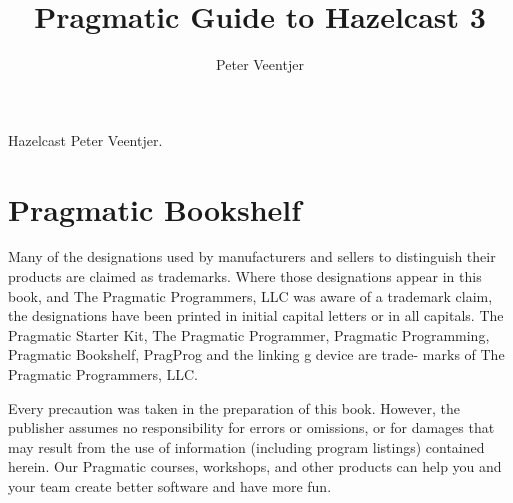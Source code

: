 \documentclass[oneside,20pt]{book}
\begin{document}
\setlength{\parindent}{0in}

\setcounter{tocdepth}{1}


\pagestyle{empty}
\title{\textbf{Pragmatic Guide to Hazelcast 3}}
\author{Peter Veentjer}

\maketitle


\thispagestyle{empty}
Hazelcast
Peter Veentjer.
\newpage


\pagestyle{fancy}
\fancyhf{}
\lhead[]{\thepage}
\rhead[\thepage]{}

\fontsize{12pt}{18pt}
\selectfont




\chapter*{Pragmatic Bookshelf}
Many of the designations used by manufacturers and sellers to distinguish their products are claimed as trademarks. 
Where those designations appear in this book, and The Pragmatic Programmers, LLC was aware of a trademark claim, the 
designations have been printed in initial capital letters or in all capitals. The Pragmatic Starter Kit, The Pragmatic 
Programmer, Pragmatic Programming, Pragmatic Bookshelf, PragProg and the linking g device are trade- marks of The 
Pragmatic Programmers, LLC.

Every precaution was taken in the preparation of this book. However, the publisher assumes no responsibility for 
errors or omissions, or for damages that may result from the use of information (including program listings) contained herein.
Our Pragmatic courses, workshops, and other products can help you and your team create better software and have more fun. 
\end{document}
